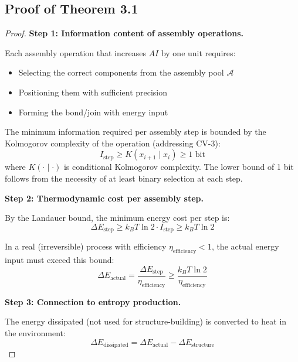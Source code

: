 \documentclass[11pt,a4paper]{article}
\begin{document}
\subsection{Proof of Theorem 3.1}

\begin{proof}
\textbf{Step 1: Information content of assembly operations.}

Each assembly operation that increases $AI$ by one unit requires:
\begin{itemize}
\item Selecting the correct components from the assembly pool $\mathcal{A}$
\item Positioning them with sufficient precision
\item Forming the bond/join with energy input
\end{itemize}

The minimum information required per assembly step is bounded by the Kolmogorov complexity of the operation (addressing CV-3):
\begin{equation}
I_{\text{step}} \geq K(x_{i+1} \mid x_i) \geq 1 \text{ bit}
\end{equation}
where $K(\cdot \mid \cdot)$ is conditional Kolmogorov complexity. The lower bound of 1 bit follows from the necessity of at least binary selection at each step.

\textbf{Step 2: Thermodynamic cost per assembly step.}

By the Landauer bound, the minimum energy cost per step is:
\begin{equation}
\Delta E_{\text{step}} \geq k_B T \ln 2 \cdot I_{\text{step}} \geq k_B T \ln 2
\end{equation}

In a real (irreversible) process with efficiency $\eta_{\text{efficiency}} < 1$, the actual energy input must exceed this bound:
\begin{equation}
\Delta E_{\text{actual}} = \frac{\Delta E_{\text{step}}}{\eta_{\text{efficiency}}} \geq \frac{k_B T \ln 2}{\eta_{\text{efficiency}}}
\end{equation}

\textbf{Step 3: Connection to entropy production.}

The energy dissipated (not used for structure-building) is converted to heat in the environment:
\begin{equation}
\Delta E_{\text{dissipated}} = \Delta E_{\text{actual}} - \Delta E_{\text{structure}}
\end{equation}


\end{proof}
\end{document}
